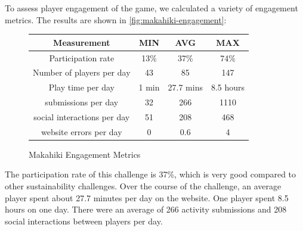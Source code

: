 \documentclass{sigchi}
\newcommand\tabhead[1]{\small\textbf{#1}}
\begin{document}
To assess player engagement of the game, we calculated a variety of engagement
metrics. The results are shown in \autoref{fig:makahiki-engagement}:

\begin{figure}[ht!]
  \centering
  \begin{tabular}{|c|c|c|c}
    \hline
    \multicolumn{1}{|p{0.5\columnwidth}|}{\centering\tabhead{Measurement}} &
    \multicolumn{1}{|p{0.1\columnwidth}|}{\centering\tabhead{MIN}} &
    \multicolumn{1}{|p{0.1\columnwidth}|}{\centering\tabhead{AVG}} &
    \multicolumn{1}{|p{0.1\columnwidth}|}{\centering\tabhead{MAX}} \\
    \hline
    \multicolumn{1}{|p{0.5\columnwidth}|}{Participation rate} &
    \multicolumn{1}{|p{0.1\columnwidth}|}{13\%} &
    \multicolumn{1}{|p{0.1\columnwidth}|}{37\%} &
    \multicolumn{1}{|p{0.1\columnwidth}|}{74\%} \\
    \hline
    \multicolumn{1}{|p{0.5\columnwidth}|}{Number of players per day} &
    \multicolumn{1}{|p{0.1\columnwidth}|}{43} &
    \multicolumn{1}{|p{0.1\columnwidth}|}{85} &
    \multicolumn{1}{|p{0.1\columnwidth}|}{147} \\
    \hline
    \multicolumn{1}{|p{0.5\columnwidth}|}{Play time per day} &
    \multicolumn{1}{|p{0.1\columnwidth}|}{1 min} &
    \multicolumn{1}{|p{0.1\columnwidth}|}{27.7 mins} &
    \multicolumn{1}{|p{0.1\columnwidth}|}{8.5 hours} \\
    \hline
    \multicolumn{1}{|p{0.5\columnwidth}|}{submissions per day} &
    \multicolumn{1}{|p{0.1\columnwidth}|}{32} &
    \multicolumn{1}{|p{0.1\columnwidth}|}{266} &
    \multicolumn{1}{|p{0.1\columnwidth}|}{1110} \\
    \hline
    \multicolumn{1}{|p{0.5\columnwidth}|}{social interactions per day} &
    \multicolumn{1}{|p{0.1\columnwidth}|}{51} &
    \multicolumn{1}{|p{0.1\columnwidth}|}{208} &
    \multicolumn{1}{|p{0.1\columnwidth}|}{468} \\
    \hline
    \multicolumn{1}{|p{0.5\columnwidth}|}{website errors per day} &
    \multicolumn{1}{|p{0.1\columnwidth}|}{0} &
    \multicolumn{1}{|p{0.1\columnwidth}|}{0.6} &
    \multicolumn{1}{|p{0.1\columnwidth}|}{4} \\
    \hline
  \end{tabular}
  \caption{Makahiki Engagement Metrics}
  \label{fig:makahiki-engagement}
\end{figure}

The participation rate of this challenge is 37\%, which is very good compared to other
sustainability challenges. Over the course of the challenge, an average player spent about
27.7 minutes per day on the website. One player spent 8.5 hours on one day. There were an
average of 266 activity submissions and 208 social interactions between players per day.
\end{document}

